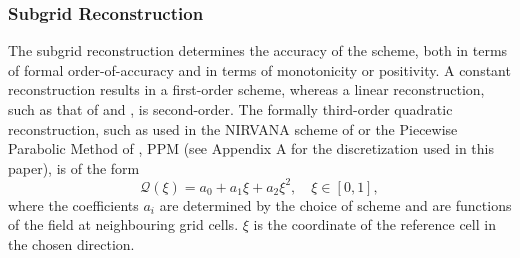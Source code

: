\documentclass{ametsocV6.1}
\begin{document}
\subsubsection{Subgrid Reconstruction}

The subgrid reconstruction determines the accuracy of the scheme, both in terms of formal order-of-accuracy and in terms of monotonicity or positivity. A constant reconstruction results in a first-order scheme, whereas a linear reconstruction, such as that of \citet{fromm1968method} and \citet{van1974towards}, is second-order. The formally third-order quadratic reconstruction, such as used in the NIRVANA scheme of \citet{leonard1995nirvana} or the Piecewise Parabolic Method of \citet{colella1984ppm}, PPM (see Appendix A for the discretization used in this paper),  is of the form
\begin{equation} \label{eqn:quad_coef}
    \mathcal{Q}(\xi) = a_0 + a_1 \xi + a_2 \xi^2, \quad \xi \in [0, 1],
\end{equation}
where the coefficients $a_i$ are determined by the choice of scheme and are functions of the field at neighbouring grid cells. $\xi$ is the coordinate of the reference cell in the chosen direction. 
\end{document}
